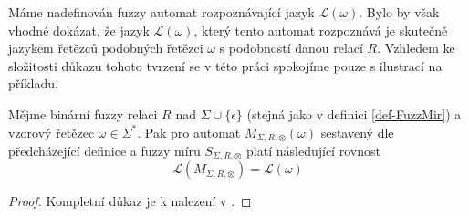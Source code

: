 \documentclass[a4paper,10pt]{article}
\begin{document}
Máme nadefinován fuzzy automat rozpoznávající jazyk $\mathcal{L}(\omega)$. Bylo by však vhodné dokázat, že jazyk $\mathcal{L}(\omega)$, který tento automat rozpoznává je skutečně jazykem řetězců podobných řetězci $\omega$ s podobností danou relací $R$. Vzhledem ke složitosti důkazu tohoto tvrzení se v této práci spokojíme pouze s ilustrací na příkladu.
\begin{theorem}\label{the-JazAutJeJazEditOper}
 Mějme binární fuzzy relaci $R$ nad $\Sigma \cup \{\epsilon\}$ (stejná jako v definici \ref{def-FuzzMir}) a vzorový řetězec $\omega \in \Sigma^*$. Pak pro automat $M_{\Sigma, R, \otimes}(\omega)$ sestavený dle předcházející definice a fuzzy míru $S_{\Sigma, R, \otimes}$ platí následující rovnost
 $$
  \mathcal{L}(M_{\Sigma, R, \otimes}) = \mathcal{L}(\omega)
 $$
\end{theorem}
\begin{proof}
 Kompletní důkaz je k nalezení v \cite{AstGonMenGar-FuzzAutEpsMovCmpFuzzMeasBtwStrs}.
\end{proof}

\end{document}
